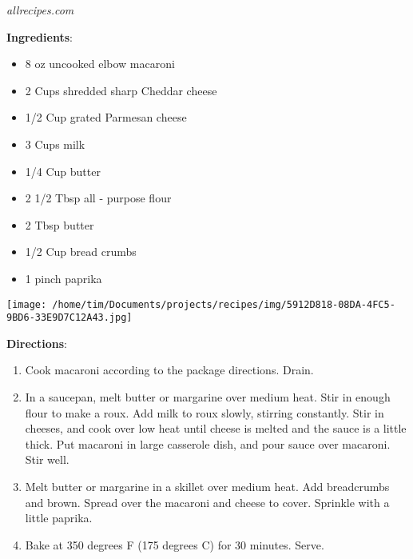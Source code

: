 \documentclass[11pt, twoside, openany]{book}
\begin{document}
 \label{mac-and-cheese}\hfill\textit{allrecipes.com}\\
\begin{minipage}[t]{0.8\linewidth}
\textbf{Ingredients}:\vspace{-3mm}
\begin{multicols}{2}
\begin{itemize}\setlength\itemsep{-1mm}
\item 8 oz uncooked elbow macaroni
\item 2 Cups shredded sharp Cheddar cheese
\item 1/2 Cup grated Parmesan cheese
\item 3 Cups milk
\item 1/4 Cup butter
\item 2 1/2 Tbsp all - purpose flour
\item 2 Tbsp butter
\item 1/2 Cup bread crumbs
\item 1 pinch paprika
\end{itemize}
\end{multicols}
\end{minipage}
\begin{minipage}[t]{0.2\linewidth}
\centering \strut\vspace*{-\baselineskip}\newline
\texttt{[image: /home/tim/Documents/projects/recipes/img/5912D818-08DA-4FC5-9BD6-33E9D7C12A43.jpg]}\\
\end{minipage}\vspace{3mm}
\textbf{Directions}:
\vspace{-3mm}\begin{enumerate}\setlength\itemsep{-1mm}
\item Cook macaroni according to the package directions. Drain.
\item In a saucepan, melt butter or margarine over medium heat. Stir in enough flour to make a roux. Add milk to roux slowly, stirring constantly. Stir in cheeses, and cook over low heat until cheese is melted and the sauce is a little thick. Put macaroni in large casserole dish, and pour sauce over macaroni. Stir well.
\item Melt butter or margarine in a skillet over medium heat. Add breadcrumbs and brown. Spread over the macaroni and cheese to cover. Sprinkle with a little paprika.
\item Bake at 350 degrees F (175 degrees C) for 30 minutes. Serve.
\end{enumerate}
\end{document}
